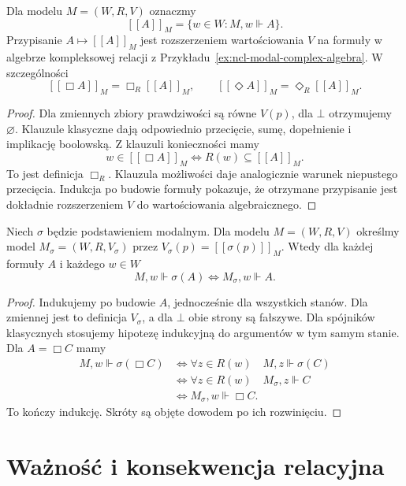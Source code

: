 \begin{stwierdzenie}
\label{prop:ncl-kripke-truth-sets}
Dla modelu $M=(W,R,V)$ oznaczmy
\[
 [\![A]\!]_M=\{w\in W:M,w\Vdash A\}.
\]
Przypisanie $A\mapsto[\![A]\!]_M$ jest
rozszerzeniem wartościowania $V$ na formuły
w algebrze kompleksowej relacji
z Przykładu~\ref{ex:ncl-modal-complex-algebra}.
W szczególności
\[
 [\![\Box A]\!]_M=\Box_R[\![A]\!]_M,\qquad
 [\![\Diamond A]\!]_M=\Diamond_R[\![A]\!]_M.
\]
\end{stwierdzenie}
\begin{proof}
Dla zmiennych zbiory prawdziwości są równe
$V(p)$, dla $\bot$ otrzymujemy $\varnothing$.
Klauzule klasyczne dają odpowiednio przecięcie,
sumę, dopełnienie i implikację boolowską.
Z klauzuli konieczności mamy
\[
 w\in[\![\Box A]\!]_M
 \iff R(w)\subseteq[\![A]\!]_M.
\]
To jest definicja $\Box_R$.
Klauzula możliwości daje analogicznie
warunek niepustego przecięcia.
Indukcja po budowie formuły pokazuje,
że otrzymane przypisanie jest dokładnie
rozszerzeniem $V$ do wartościowania algebraicznego.
\end{proof}

\begin{lemat}
\label{lem:ncl-kripke-substitution}
Niech $\sigma$ będzie podstawieniem modalnym.
Dla modelu $M=(W,R,V)$ określmy model
$M_\sigma=(W,R,V_\sigma)$ przez
$V_\sigma(p)=[\![\sigma(p)]\!]_M$.
Wtedy dla każdej formuły $A$ i każdego $w\in W$
\[
 M,w\Vdash\sigma(A)\iff M_\sigma,w\Vdash A.
\]
\end{lemat}
\begin{proof}
Indukujemy po budowie $A$, jednocześnie
dla wszystkich stanów.
Dla zmiennej jest to definicja $V_\sigma$,
a dla $\bot$ obie strony są fałszywe.
Dla spójników klasycznych stosujemy hipotezę
indukcyjną do argumentów w tym samym stanie.
Dla $A=\Box C$ mamy
\[
\begin{aligned}
 M,w\Vdash\sigma(\Box C)
 &\iff \forall z\in R(w)\quad M,z\Vdash\sigma(C)\\
 &\iff \forall z\in R(w)\quad M_\sigma,z\Vdash C\\
 &\iff M_\sigma,w\Vdash\Box C.
\end{aligned}
\]
To kończy indukcję. Skróty są objęte dowodem
po ich rozwinięciu.
\end{proof}

\section{Ważność i konsekwencja relacyjna}


